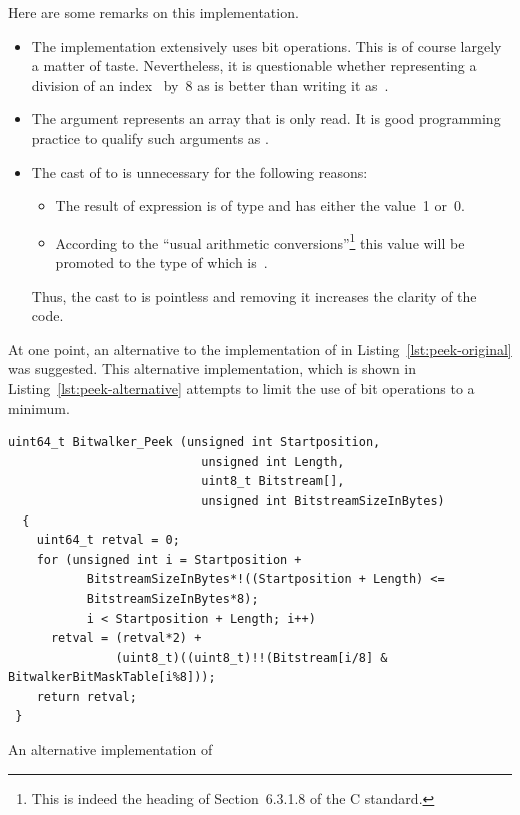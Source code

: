 Here are some remarks on this implementation.

\begin{itemize}
\item The implementation extensively uses bit operations.
      This is of course largely a matter of taste.
      Nevertheless, it is questionable whether representing a division 
      of an index~ by~8 as  is better than writing it as~.
\item The argument  represents an array that is only read.
      It is good programming practice to qualify such arguments as .

\item The cast of  to  is unnecessary for the following reasons:
\begin{itemize}
\item The result of expression  is of type  and has either the value~1 or~0.
\item According to the ``usual arithmetic conversions''\footnote{%
     This is indeed the heading of Section~6.3.1.8 of the C standard.
}
this value will be promoted to the type of  which is~.
\end{itemize}

    Thus, the cast to  is pointless and removing it increases the clarity of the code.

\end{itemize}

\clearpage
At one point, an alternative to the implementation of \peek in
Listing~\ref{lst:peek-original} was suggested.
This alternative implementation, which is shown in Listing~\ref{lst:peek-alternative}
attempts to limit the use of bit operations to a minimum.


\begin{listing}[hbt]
\begin{minipage}{\textwidth}
\begin{lstlisting}[style=acsl-block,frame=single]
  uint64_t Bitwalker_Peek (unsigned int Startposition,
                           unsigned int Length,
                           uint8_t Bitstream[],
                           unsigned int BitstreamSizeInBytes)
  {
    uint64_t retval = 0;
    for (unsigned int i = Startposition +
           BitstreamSizeInBytes*!((Startposition + Length) <=
           BitstreamSizeInBytes*8);
           i < Startposition + Length; i++)
      retval = (retval*2) +
               (uint8_t)((uint8_t)!!(Bitstream[i/8] & BitwalkerBitMaskTable[i%8]));
    return retval;
 }
\end{lstlisting}
\end{minipage}
\caption{\label{lst:peek-alternative} An alternative implementation of \peek}
\end{listing}

